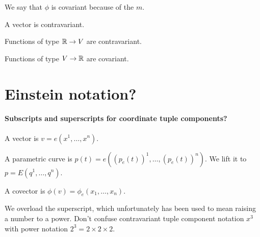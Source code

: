 We say that \(\phi\) is covariant because of the \(m\).

A vector is contravariant.

Functions of type \( \mathbb{R} \to V \) are contravariant.

Functions of type \( V \to \mathbb{R} \) are covariant.

\section{Einstein notation?}

\paragraph{Subscripts and superscripts for coordinate tuple components?}

A vector is \(v = e(x^1,\ldots,x^n)\).

A parametric curve is \(p(t) = e((p_e(t))^1, \ldots, (p_e(t))^n)\).
We lift it to \(p = E(q^1, \ldots, q^n)\).

A covector is \(\phi(v) = \phi_e(x_1,\ldots,x_n)\).

We overload the superscript, which unfortunately has been used to mean raising a number to a power.
Don't confuse contravariant tuple component notation \(x^3\)
with power notation \(2^3 = 2 \times 2 \times 2\).
